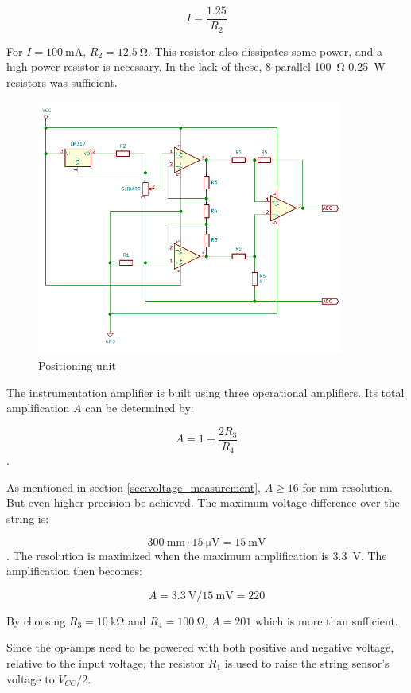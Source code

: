\documentclass{article}
\begin{document}
$$ I = \frac{1.25}{R_2} $$

For $ I = \SI{100}{\milli\ampere} $, $R_2 = \SI{12.5}{\ohm} $. This resistor also dissipates some power, and a high power resistor is necessary. In the lack of these, 8 parallel \SI{100}{\ohm} \SI{0.25}{\watt} resistors was sufficient.

\begin{figure}[ht]
  \centering
  \includegraphics[width=0.9\textwidth]{slidarr-circuit}
  \caption{Positioning unit}
  \label{fig:slidarr-circuit}
\end{figure}

The instrumentation amplifier is built using three operational amplifiers. Its total amplification $A$ can be determined by:

$$ A = 1 + \frac{2R_3}{R_4} $$. 

As mentioned in section \ref{sec:voltage_measurement}, $ A \geq 16 $ for \si{\milli\meter} resolution. But even higher precision be achieved. The maximum voltage difference over the string is:

$$\SI{300}{\milli\meter} \cdot \SI{15}{\micro\volt}= \SI{15}{\milli\volt} $$. 
The resolution is maximized when the maximum amplification is \SI{3.3}{\volt}. The amplification then becomes:

$$ A = \SI{3.3}{\volt} / \SI{15}{\milli\volt} = 220 $$ 

By choosing $R_3 = \SI{10}{\kilo\ohm} $ and $R_4 = \SI{100}{\ohm} $, $ A = 201 $ which is more than sufficient.

Since the op-amps need to be powered with both positive and negative voltage, relative to the input voltage, the resistor $R_1$ is used to raise the string sensor's voltage to $V_{CC}/2$.
\end{document}
